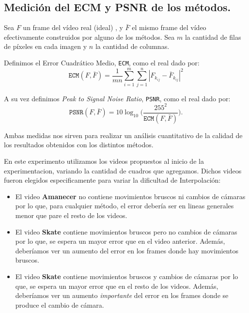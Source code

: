 \subsection{Medición del ECM y PSNR de los métodos.}\label{ECM}
Sea $F$ un frame del vídeo real (ideal) , y $\bar{F}$ el mismo frame del vídeo efectivamente construidos por alguno de los métodos. Sea $m$ la cantidad de filas de píxeles en cada imagen y $n$ la cantidad de columnas.

Definimos el Error Cuadrático Medio, \texttt{ECM}, como el real dado por:
\begin{equation}
\texttt{ECM}(F,\bar{F}) = \frac{1}{mn}\sum_{i=1}^m\sum_{j = 1}^n |F_{k_{ij}} - \bar{F}_{k_{ij}}|^2
\end{equation}

A su vez definimos \emph{Peak to Signal Noise Ratio}, \texttt{PSNR}, como el real dado por:
\begin{equation}
\texttt{PSNR}(F,\bar{F}) = 10 \log_{10}\bigg(\frac{255^2}{\texttt{ECM}(F,\bar{F})}\bigg). \label{eq:psnr}
\end{equation}

Ambas medidas nos sirven para realizar un análisis cuantitativo de la calidad de los resultados obtenidos con los distintos métodos.

En este experimento utilizamos los videos propuestos al inicio de la experimentacion, variando la cantidad de cuadros que agregamos.
Dichos videos fueron elegidos especificamente para variar la dificultad de Interpolación:
\begin{itemize}
    \item El video \textbf{Amanecer} no contiene movimientos bruscos ni cambios de cámaras
        por lo que, para cualquier método, el error debería ser en lineas generales
        menor que pare el resto de los videos.
    \item El video \textbf{Skate} contiene movimientos bruscos pero no cambios de cámaras
        por lo que, se espera un mayor error que en el video anterior. Además,
        deberíamos ver un aumento del error en los frames donde hay movimientos
        bruscos.
    \item El video \textbf{Skate} contiene movimientos bruscos y cambios de cámaras
        por lo que, se espera un mayor error que en el resto de los videos. Además,
        deberíamos ver un aumento \textit{importante} del error en los frames
        donde se produce el cambio de cámara.
\end{itemize}


